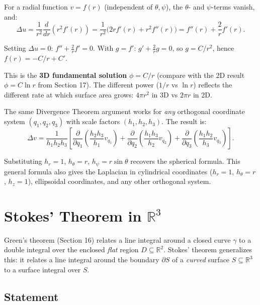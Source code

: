 \documentclass[11pt]{report}
\newcommand{\R}{\mathbb{R}}
\newcommand{\parti}[2]{\frac{\partial #1}{\partial #2}}
\begin{document}
\begin{remark}
For a radial function $v = f(r)$ (independent of $\theta, \psi$), the $\theta$- and $\psi$-terms vanish, and:
\[
\Delta u = \frac{1}{r^2}\frac{d}{dr}\!\left(r^2 f'(r)\right) = \frac{1}{r^2}\big(2r f'(r) + r^2 f''(r)\big) = f''(r) + \frac{2}{r}f'(r).
\]

Setting $\Delta u = 0$: $f'' + \frac{2}{r}f' = 0$. With $g = f'$: $g' + \frac{2}{r}g = 0$, so $g = C/r^2$, hence $f(r) = -C/r + C'$.

This is the \textbf{3D fundamental solution} $\phi = C/r$ (compare with the 2D result $\phi = C\ln r$ from Section 17). The different power ($1/r$ vs $\ln r$) reflects the different rate at which surface area grows: $4\pi r^2$ in 3D vs $2\pi r$ in 2D.
\end{remark}

\begin{remark}
The same Divergence Theorem argument works for \textit{any} orthogonal coordinate system $(q_1, q_2, q_3)$ with scale factors $(h_1, h_2, h_3)$. The result is:
\[
\Delta v = \frac{1}{h_1 h_2 h_3}\left[\parti{}{q_1}\!\left(\frac{h_2 h_3}{h_1} v_{q_1}\right) + \parti{}{q_2}\!\left(\frac{h_1 h_3}{h_2} v_{q_2}\right) + \parti{}{q_3}\!\left(\frac{h_1 h_2}{h_3} v_{q_3}\right)\right].
\]

Substituting $h_r = 1$, $h_\theta = r$, $h_\psi = r\sin\theta$ recovers the spherical formula. This general formula also gives the Laplacian in cylindrical coordinates ($h_r = 1$, $h_\theta = r$, $h_z = 1$), ellipsoidal coordinates, and any other orthogonal system.
\end{remark}

\section{Stokes' Theorem in $\R^3$}

Green's theorem (Section 16) relates a line integral around a closed curve $\gamma$ to a double integral over the enclosed \textit{flat} region $D \subseteq \R^2$. Stokes' theorem generalizes this: it relates a line integral around the boundary $\partial S$ of a \textit{curved} surface $S \subseteq \R^3$ to a surface integral over $S$.

\subsection{Statement}
\end{document}
